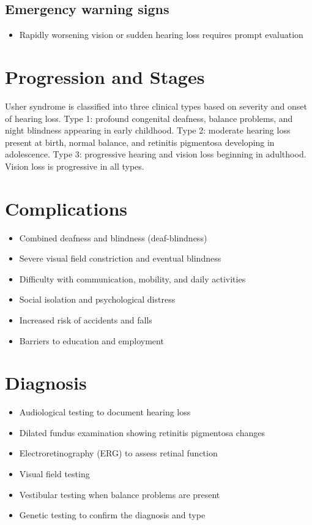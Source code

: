 \subsection{Emergency warning signs}
\begin{itemize}[noitemsep]
  \item Rapidly worsening vision or sudden hearing loss requires prompt evaluation
\end{itemize}
\section{Progression and Stages}
Usher syndrome is classified into three clinical types based on severity and onset of hearing loss. Type 1: profound congenital deafness, balance problems, and night blindness appearing in early childhood. Type 2: moderate hearing loss present at birth, normal balance, and retinitis pigmentosa developing in adolescence. Type 3: progressive hearing and vision loss beginning in adulthood. Vision loss is progressive in all types.
\section{Complications}
\begin{itemize}[noitemsep]
  \item Combined deafness and blindness (deaf-blindness)
  \item Severe visual field constriction and eventual blindness
  \item Difficulty with communication, mobility, and daily activities
  \item Social isolation and psychological distress
  \item Increased risk of accidents and falls
  \item Barriers to education and employment
\end{itemize}
\section{Diagnosis}
\begin{itemize}[noitemsep]
  \item Audiological testing to document hearing loss
  \item Dilated fundus examination showing retinitis pigmentosa changes
  \item Electroretinography (ERG) to assess retinal function
  \item Visual field testing
  \item Vestibular testing when balance problems are present
  \item Genetic testing to confirm the diagnosis and type
\end{itemize}
